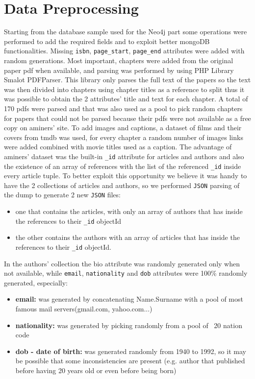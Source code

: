 \documentclass{Configuration_Files/PoliMi3i_thesis}
\begin{document}
\section{Data Preprocessing}
Starting from the database sample used for the Neo4j part some operations were performed to add the required fields and
to exploit better mongoDB functionalities. \newline
Missing \verb |isbn|, \verb |page_start|, \verb |page_end| attributes were added with random generations.\newline
Most important, chapters were added from the original paper pdf when available, and parsing was performed by using PHP
Library Smalot PDFParser. This library only parses the full text of the papers so the text was then divided into chapters
using chapter titles as a reference to split thus it was possible to obtain the 2 attributes' title and text for each
chapter. A total of 170 pdfs were parsed and that was also used as a pool to pick random chapters for papers that could
not be parsed because their pdfs were not available as a free copy on aminers' site.\newline
To add images and captions, a dataset of films and their covers from tmdb was used, for every chapter a random number of
images links were added combined with movie titles used as a caption.\newline
The advantage of aminers' dataset was the built-in \verb |_id| attribute for articles and authors and also the existence of an
array of references with the list of the referenced \verb |_id| inside every article tuple.\newline
To better exploit this opportunity we believe it was handy to have the 2 collections of articles and authors, so we
performed \verb |JSON| parsing of the dump to generate 2 new \verb |JSON| files:
\begin{itemize}
	\item one that contains the articles, with only an array of authors that has inside the references to their \verb |_id| objectId
	\item the other contains the authors with an array of articles that has inside the references to their \verb |_id| objectId.
\end{itemize}
In the authors' collection the bio attribute was randomly generated only when not available, while \verb |email|, \verb |nationality| and
\verb |dob| attributes were 100\% randomly generated, especially:
\begin{itemize}
	\item \textbf{email:} was generated by concatenating Name.Surname with a pool of most famous mail servers(gmail.com, yahoo.com...)
	\item \textbf{nationality:} was generated by picking randomly from a pool of ~20 nation code
	\item \textbf{dob - date of birth:} was generated randomly from 1940 to 1992, so it may be possible that some inconsistencies are
		present (e.g. author that published before having 20 years old or even before being born)
\end{itemize}
\end{document}
